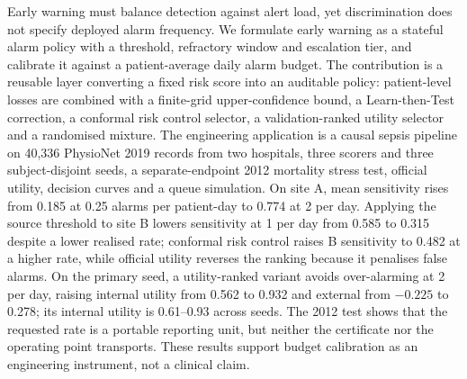 Early warning must balance detection against alert load, yet discrimination does not specify deployed alarm frequency. We formulate early warning as a stateful alarm policy with a threshold, refractory window and escalation tier, and calibrate it against a patient-average daily alarm budget. The contribution is a reusable layer converting a fixed risk score into an auditable policy: patient-level losses are combined with a finite-grid upper-confidence bound, a Learn-then-Test correction, a conformal risk control selector, a validation-ranked utility selector and a randomised mixture. The engineering application is a causal sepsis pipeline on 40{,}336 PhysioNet 2019 records from two hospitals, three scorers and three subject-disjoint seeds, a separate-endpoint 2012 mortality stress test, official utility, decision curves and a queue simulation. On site A, mean sensitivity rises from 0.185 at 0.25 alarms per patient-day to 0.774 at 2 per day. Applying the source threshold to site B lowers sensitivity at 1 per day from 0.585 to 0.315 despite a lower realised rate; conformal risk control raises B sensitivity to 0.482 at a higher rate, while official utility reverses the ranking because it penalises false alarms. On the primary seed, a utility-ranked variant avoids over-alarming at 2 per day, raising internal utility from 0.562 to 0.932 and external from $-0.225$ to 0.278; its internal utility is 0.61--0.93 across seeds. The 2012 test shows that the requested rate is a portable reporting unit, but neither the certificate nor the operating point transports. These results support budget calibration as an engineering instrument, not a clinical claim.
